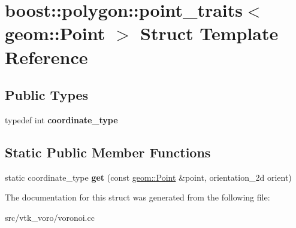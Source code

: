 \hypertarget{structboost_1_1polygon_1_1point__traits_3_01geom_1_1Point_01_4}{}\section{boost\+:\+:polygon\+:\+:point\+\_\+traits$<$ geom\+:\+:Point $>$ Struct Template Reference}
\label{structboost_1_1polygon_1_1point__traits_3_01geom_1_1Point_01_4}
\subsection*{Public Types}
\begin{DoxyCompactItemize}
\item 
typedef int {\bfseries coordinate\+\_\+type}\hypertarget{structboost_1_1polygon_1_1point__traits_3_01geom_1_1Point_01_4_ab0ab61db2cae759d4b0f0d5a8b3a727e}{}\label{structboost_1_1polygon_1_1point__traits_3_01geom_1_1Point_01_4_ab0ab61db2cae759d4b0f0d5a8b3a727e}

\end{DoxyCompactItemize}
\subsection*{Static Public Member Functions}
\begin{DoxyCompactItemize}
\item 
static coordinate\+\_\+type {\bfseries get} (const \hyperlink{classgeom_1_1Point}{geom\+::\+Point} \&point, orientation\+\_\+2d orient)\hypertarget{structboost_1_1polygon_1_1point__traits_3_01geom_1_1Point_01_4_ae75641e7f29ba599e717ee7e7ff3fb11}{}\label{structboost_1_1polygon_1_1point__traits_3_01geom_1_1Point_01_4_ae75641e7f29ba599e717ee7e7ff3fb11}

\end{DoxyCompactItemize}


The documentation for this struct was generated from the following file\+:\begin{DoxyCompactItemize}
\item 
src/vtk\+\_\+voro/voronoi.\+cc\end{DoxyCompactItemize}
